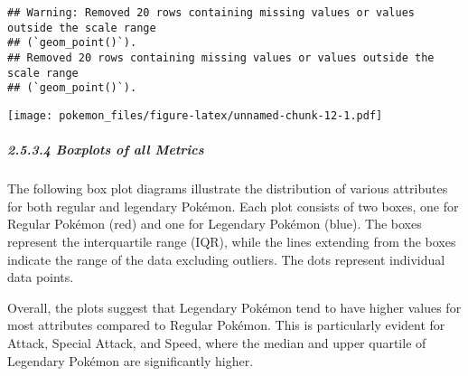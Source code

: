 \documentclass[
]{article}
\begin{document}
\begin{verbatim}
## Warning: Removed 20 rows containing missing values or values outside the scale range
## (`geom_point()`).
## Removed 20 rows containing missing values or values outside the scale range
## (`geom_point()`).
\end{verbatim}

\texttt{[image: pokemon\_files/figure-latex/unnamed-chunk-12-1.pdf]}

\subparagraph{2.5.3.4 Boxplots of all
Metrics}\label{boxplots-of-all-metrics}

The following box plot diagrams illustrate the distribution of various
attributes for both regular and legendary Pokémon. Each plot consists of
two boxes, one for Regular Pokémon (red) and one for Legendary Pokémon
(blue). The boxes represent the interquartile range (IQR), while the
lines extending from the boxes indicate the range of the data excluding
outliers. The dots represent individual data points.

Overall, the plots suggest that Legendary Pokémon tend to have higher
values for most attributes compared to Regular Pokémon. This is
particularly evident for Attack, Special Attack, and Speed, where the
median and upper quartile of Legendary Pokémon are significantly higher.
\end{document}
